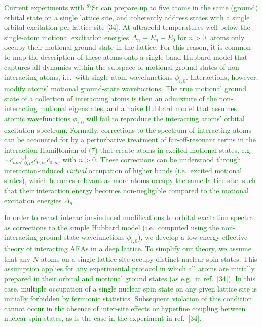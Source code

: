 \documentclass[preprint]{revtex4-1}
\renewcommand{\c}{\hat{c}}
\newcommand{\1}{\mathds{1}}
\newcommand{\green}[1]{\textcolor{green}{#1}}
\begin{document}
\begin{enumerate}
  \green{Current experiments with ${}^{87}$Sr can prepare up to five
    atoms in the same (ground) orbital state on a single lattice site,
    and coherently address states with a single orbital excitation per
    lattice site [34].  At ultracold temperatures well below the
    single-atom motional excitation energies $\Delta_n\equiv E_n-E_0$
    for $n>0$, atoms only occupy their motional ground state in the
    lattice.  For this reason, it is common to map the description of
    these atoms onto a single-band Hubbard model that captures all
    dynamics within the subspace of motional ground states of
    non-interacting atoms, i.e.~with single-atom wavefunctions
    $\phi_{i,0}$.  Interactions, however, modify atoms' motional
    ground-state wavefuctions.  The true motional ground state of a
    collection of interacting atoms is then an admixture of the
    non-interacting motional eigenstates, and a naive Hubbard model
    that assumes atomic wavefunctions $\phi_{i,0}$ will fail to
    reproduce the interacting atoms' orbital excitation spectrum.
    Formally, corrections to the spectrum of interacting atoms can be
    accounted for by a perturbative treatment of far-off-resonant
    terms in the interaction Hamiltonian of (7) that create atoms in
    excited motional states,
    e.g.~$\sim\c_{n\mu s}^\dag \c_{0,\nu t}^\dag \c_{0,\nu r}
    \c_{0,\mu q}$ with $n>0$.  These corrections can be understood
    through interaction-induced {\it virtual} occupation of higher
    bands (i.e.~excited motional states), which becomes relevant as
    more atoms occupy the same lattice site, such that their
    interaction energy becomes non-negligible compared to the motional
    excitation energies $\Delta_n$.}

  \green{In order to recast interaction-induced modifications to
    orbital excitation spectra as corrections to the simple Hubbard
    model (i.e.~computed using the non-interacting ground-state
    wavefunctions $\phi_{i,0}$), we develop a low-energy effective
    theory of interacting AEAs in a deep lattice.  To simplify our
    theory, we assume that any $N$ atoms on a single lattice site
    occupy distinct nuclear spin states.  This assumption applies for
    any experimental protocol in which all atoms are initially
    prepared in their orbital and motional ground states (as e.g.~in
    ref.~[34]).  In this case, multiple occupation of a single nuclear
    spin state on any given lattice site is initially forbidden by
    fermionic statistics.  Subsequent violation of this condition
    cannot occur in the absence of inter-site effects or hyperfine
    coupling between nuclear spin states, as is the case in the
    experiment in ref.~[34].}


\end{enumerate}
\end{document}
